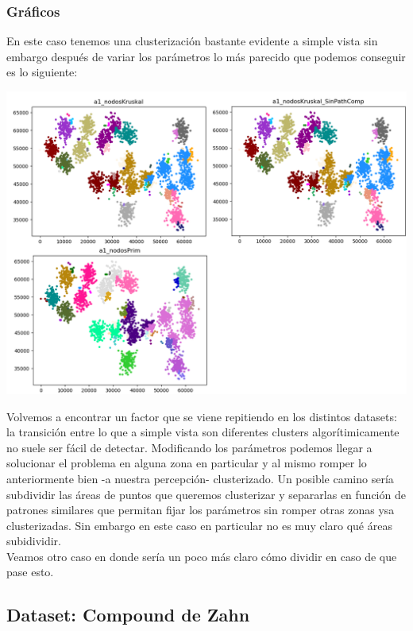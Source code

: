 \documentclass[11pt,a4paper]{article}
\begin{document}
\subsubsection{Gráficos}
En este caso tenemos una clusterización bastante evidente a simple vista sin embargo después de variar los parámetros lo más parecido que podemos conseguir es lo siguiente:
\begin{center}
\includegraphics[scale=.41]{graficos/a1_nodosKruskal_Prim.png}
\end{center}
Volvemos a encontrar un factor que se viene repitiendo en los distintos datasets: la transición entre lo que a simple vista son diferentes clusters algorítimicamente no suele ser fácil de detectar. Modificando los parámetros podemos llegar a solucionar el problema en alguna zona en particular y al mismo romper lo anteriormente bien -a nuestra percepción- clusterizado. Un posible camino sería subdividir las áreas de puntos que queremos clusterizar y separarlas en función de patrones similares que permitan fijar los parámetros sin romper otras zonas ysa clusterizadas. Sin embargo en este caso en particular no es muy claro qué áreas subidividir.\\
Veamos otro caso en donde sería un poco más claro cómo dividir en caso de que pase esto.

\subsection{Dataset: Compound de Zahn}
\end{document}
